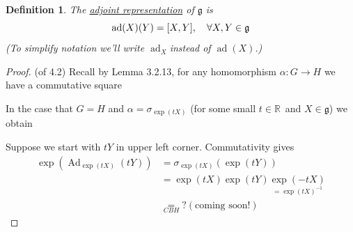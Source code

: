 \documentclass[12pt,a4paper]{article}
\newcommand{\rR}{\ensuremath{\mathbb{R}\,}}
\newcommand{\dgq}[2]{\ensuremath{d {#1}_{#2}}}
\newcommand{\lalg}{\ensuremath{\mathfrak{g}}}
\newcommand{\lall}[1]{\ensuremath{\mathfrak{#1}}}
\newcommand{\ul}[1]{\underline{#1}}
\newcommand{\Adh}[1]{\ensuremath{\operatorname{Ad}_{#1}}}
\newcommand{\ad}{\ensuremath{\operatorname{ad}}}
\newcommand{\adx}{\ensuremath{\operatorname{ad}_X}}
\newtheorem{defn}[thm]{Definition}
\begin{document}
\begin{defn}
The \ul{adjoint representation} of $\lalg$ is 
\[\ad(X)(Y)=\comm{X}{Y}, \quad \forall X,Y\in \lalg\]
(To simplify notation we'll write \adx instead of $\ad(X)$.)
\end{defn}
\begin{proof}(of 4.2)
Recall by Lemma 3.2.13, for any homomorphism $\alpha:G\to H$ we have a commutative square 
\begin{center}
\end{center}
In the case that $G=H$ and $\alpha=\sigma_{\exp(tX)}$ (for some small $t\in \rR$ and $X\in \lalg$) we obtain
\begin{center}
\end{center}
Suppose we start with $tY$ in upper left corner. Commutativity gives
\begin{align*}
\exp(\Adh{\exp(tX)}(tY))&=\sigma_{\exp(tX)}(\exp(tY))\\
&=\exp(tX)\exp(tY)\underset{=\exp(tX)^{-1}}{\exp(-tX)}\\
&\underset{CBH}{=}? (\text{coming soon!})
\end{align*}
\end{proof}
\end{document}
